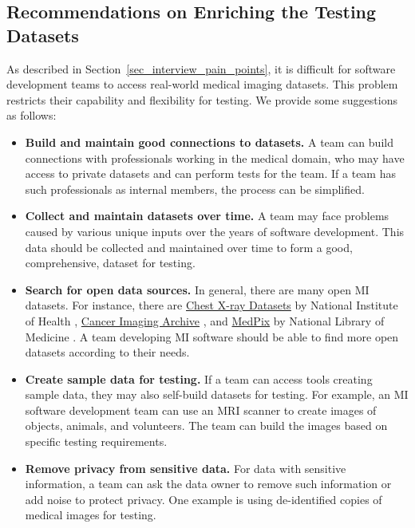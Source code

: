 \documentclass[final, 3p, times, authoryear]{elsarticle}
\begin{document}
\subsection{Recommendations on Enriching the Testing Datasets} 
\label{sec_recommendations_testing_dataset}

As described in Section~\ref{sec_interview_pain_points}, it is difficult for
software development teams to access real-world medical imaging datasets. This
problem restricts their capability and flexibility for testing. We provide some
suggestions as follows:

\begin{itemize}
\item \textbf{Build and maintain good connections to datasets.} A team can build
connections with professionals working in the medical domain, who may have
access to private datasets and can perform tests for the team. If a team has
such professionals as internal members, the process can be simplified.

\item \textbf{Collect and maintain datasets over time.} A team may face problems
caused by various unique inputs over the years of software development. This
data should be collected and maintained over time to form a good, comprehensive,
dataset for testing.

\item \textbf{Search for open data sources.} In general, there are many open MI
datasets.  For instance, there are
\href{https://nihcc.app.box.com/v/ChestXray-NIHCC}{Chest X-ray Datasets} by
National Institute of Health \citep{WangEtAl2017},
\href{https://www.cancerimagingarchive.net/}{Cancer Imaging Archive}
\citep{PriorEtAl2017}, and \href{https://medpix.nlm.nih.gov/home}{MedPix} by
National Library of Medicine \citep{Smirniotopoulos2014}. A team developing MI
software should be able to find more open datasets according to their needs.

\item \textbf{Create sample data for testing.} If a team can access tools
creating sample data, they may also self-build datasets for testing. For
example, an MI software development team can use an MRI scanner to create images
of objects, animals, and volunteers. The team can build the images based on
specific testing requirements.

\item \textbf{Remove privacy from sensitive data.} For data with sensitive
information, a team can ask the data owner to remove such information or add
noise to protect privacy. One example is using de-identified copies of medical
images for testing.


\end{itemize}
\end{document}
